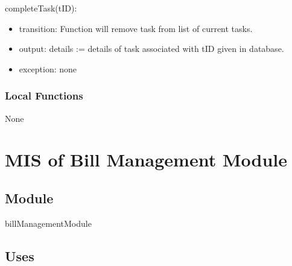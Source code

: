 \documentclass[12pt, titlepage]{article}
\begin{document}
\noindent completeTask(tID):
\begin{itemize}
\item transition: Function will remove task from list of current tasks.
\item output: details := details of task associated with tID given in database.
\item exception: none
\end{itemize}




\subsubsection{Local Functions}


None



\section{MIS of Bill Management Module} \label{mB} 



\subsection{Module}

billManagementModule


\subsection{Uses}
\end{document}
